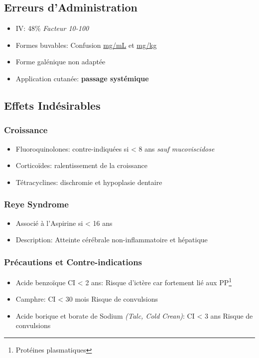\documentclass[11pt]{article}
\begin{document}
\subsection{Erreurs d'Administration}
\label{sec:org2cacc96}
\begin{itemize}
\item IV: 48\% \emph{Facteur 10-100}
\item Formes buvables: Confusion \uline{mg/mL} et \uline{mg/kg}
\item Forme galénique non adaptée
\item Application cutanée: \textbf{passage systémique}
\end{itemize}
\subsection{Effets Indésirables}
\label{sec:org3dc627c}
\subsubsection{Croissance}
\label{sec:org2ca6dc2}
\begin{itemize}
\item Fluoroquinolones: contre-indiquées si < 8 ans \emph{sauf mucoviscidose}
\item Corticoïdes: ralentissement de la croissance
\item Tétracyclines: dischromie et hypoplasie dentaire
\end{itemize}
\subsubsection{Reye Syndrome}
\label{sec:org7ae5cb2}
\begin{itemize}
\item Associé à l'Aspirine si < 16 ans
\item Description: Atteinte cérébrale non-inflammatoire et hépatique
\end{itemize}
\subsubsection{Précautions et Contre-indications}
\label{sec:org64a705d}
\begin{itemize}
\item Acide benzoïque CI < 2 ans:
Risque d'ictère car fortement lié aux PP\footnote{Protéines plasmatiques}
\item Camphre: CI < 30 mois
Risque de convulsions
\item Acide borique et borate de Sodium \emph{(Talc, Cold Crean)}: CI < 3 ans
Risque de convulsions
\end{itemize}
\end{document}
